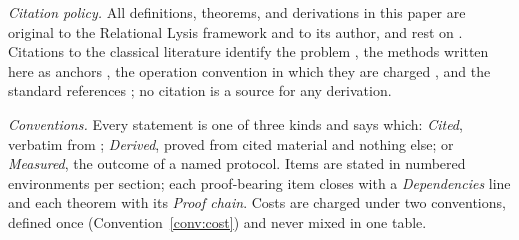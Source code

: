 \documentclass[pdflatex,sn-mathphys-num]{sn-jnl}
\theoremstyle{thmstyleone}%
\theoremstyle{thmstyletwo}%
\theoremstyle{thmstylethree}%
\newcommand{\PA}{\cite{Swanagon2026PA}}
\begin{document}
\emph{Citation policy.} All definitions, theorems, and derivations in this paper are original to the Relational Lysis framework and to its author, and rest on \PA{}. Citations to the classical literature identify the problem \citep{Cook1971,Karp1972,Levin1973,Cook2000}, the methods written here as anchors \citep{Bellman1957,HorowitzSahni1974,GareyJohnson1979}, the operation convention in which they are charged \citep{CookReckhow1973}, and the standard references \citep{Papadimitriou1994,AroraBarak2009,Sipser2012,Fortnow2009,Aaronson2016,KoiliarisXu2017,Bringmann2017}; no citation is a source for any derivation.

\emph{Conventions.} Every statement is one of three kinds and says which: \emph{Cited}, verbatim from \PA{}; \emph{Derived}, proved from cited material and nothing else; or \emph{Measured}, the outcome of a named protocol. Items are stated in numbered environments per section; each proof-bearing item closes with a \emph{Dependencies} line and each theorem with its \emph{Proof chain}. Costs are charged under two conventions, defined once (Convention~\ref{conv:cost}) and never mixed in one table.
\end{document}
